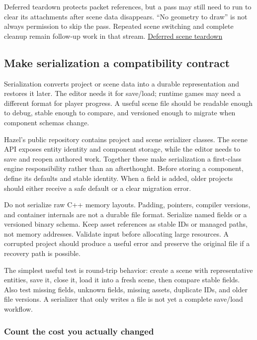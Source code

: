 Deferred teardown protects packet references, but a pass may still need to run to clear its attachments after scene data disappears. ``No geometry to draw'' is not always permission to skip the pass. Repeated scene switching and complete cleanup remain follow-up work in that stream. \href{https://www.youtube.com/watch?v=FSW72FbVUJk}{Deferred scene teardown}

\subsection{Make serialization a compatibility contract}\label{06-engine-ii-ch032-make-serialization-a-compatibility-contract}

Serialization converts project or scene data into a durable representation and restores it later. The editor needs it for save/load; runtime games may need a different format for player progress. A useful scene file should be readable enough to debug, stable enough to compare, and versioned enough to migrate when component schemas change.

Hazel's public repository contains project and scene serializer classes. The scene API exposes entity identity and component storage, while the editor needs to save and reopen authored work. Together these make serialization a first-class engine responsibility rather than an afterthought. Before storing a component, define its defaults and stable identity. When a field is added, older projects should either receive a safe default or a clear migration error.

Do not serialize raw C++ memory layouts. Padding, pointers, compiler versions, and container internals are not a durable file format. Serialize named fields or a versioned binary schema. Keep asset references as stable IDs or managed paths, not memory addresses. Validate input before allocating large resources. A corrupted project should produce a useful error and preserve the original file if a recovery path is possible.

The simplest useful test is round-trip behavior: create a scene with representative entities, save it, close it, load it into a fresh scene, then compare stable fields. Also test missing fields, unknown fields, missing assets, duplicate IDs, and older file versions. A serializer that only writes a file is not yet a complete save/load workflow.

\subsubsection{Count the cost you actually changed}\label{06-engine-ii-ch032-count-the-cost-you-actually-changed}

